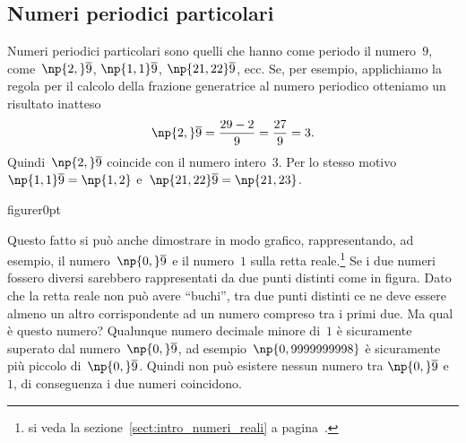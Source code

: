 
\subsection{Numeri periodici particolari}

Numeri periodici particolari sono quelli che hanno come periodo il numero~$9$,
come~$\np{2,}\overline{9}$, $\np{1,1}\overline{9}$, $\np{21,22}\overline{9}$, ecc.
Se, per esempio, applichiamo la regola per il calcolo della frazione generatrice al numero periodico
otteniamo un risultato inatteso
\[\np{2,}\overline{9}=\frac{29-2}{9}=\frac{27}{9}=3.\]
Quindi~$\np{2,}\overline{9}$ coincide con il numero intero~$3$.
Per lo stesso motivo~$\np{1,1}\overline{9}=\np{1,2}$ e~$\np{21,22}\overline{9}=\np{21,23}$.
\pagebreak
\begin{wrapfloat}{figure}{r}{0pt}

\end{wrapfloat}

Questo fatto si può anche dimostrare in modo grafico, rappresentando, ad esempio, il numero~$\np{0,}\overline{9}$ e
il numero~$1$ sulla retta reale.\footnote{si veda la sezione~\ref{sect:intro_numeri_reali} a pagina~\pageref{sect:intro_numeri_reali}.}
Se i due numeri fossero diversi sarebbero rappresentati da due punti distinti
come in figura. Dato che la retta reale non può avere ``buchi'',
tra due punti distinti ce ne deve essere almeno un altro corrispondente ad un numero compreso tra i primi due.
Ma qual è questo numero? Qualunque numero decimale minore di~$1$ è sicuramente superato dal numero~$\np{0,}\overline{9}$,
ad esempio~$\np{0,9999999998}$ è sicuramente più piccolo di~$\np{0,}\overline{9}$. Quindi non può esistere nessun numero tra
$\np{0,}\overline{9}$ e~$1$,
di conseguenza i due numeri coincidono.

\ovalbox{\risolvii \ref{ese:3.27}, \ref{ese:3.28}, \ref{ese:3.29}, \ref{ese:3.30}, \ref{ese:3.31}, \ref{ese:3.32}}


